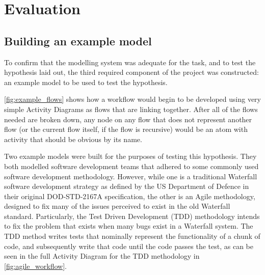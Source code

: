 
\chapter{Evaluation}
\label{evaluation}

\section{Building an example model}
To confirm that the modelling system was adequate for the task, and to test the hypothesis laid out, the third required component of the project was constructed: an example model to be used to test the hypothesis. \par
\cref{fig:example_flows} shows how a workflow would begin to be developed using very simple Activity Diagrams as flows that are linking together. After all of the flows needed are broken down, any node on any flow that does not represent another flow (or the current flow itself, if the flow is recursive) would be an atom with activity that should be obvious by its name. \par
Two example models were built for the purposes of testing this hypothesis. They both modelled software development teams that adhered to some commonly used software development methodology. However, while one is a traditional Waterfall software development strategy as defined by the US Department of Defence in their original DOD-STD-2167A specification\cite{DEPARTAMENTOFDEFENSE1984}, the other is an Agile methodology, designed to fix many of the issues perceived to exist in the old Waterfall standard. Particularly, the Test Driven Development (TDD) methodology intends to fix the problem that exists when many bugs exist in a Waterfall system. The TDD method writes tests that nominally represent the functionality of a chunk of code, and subsequently write that code until the code passes the test, as can be seen in the full Activity Diagram for the TDD methodology in \cref{fig:agile_workflow}. \par

